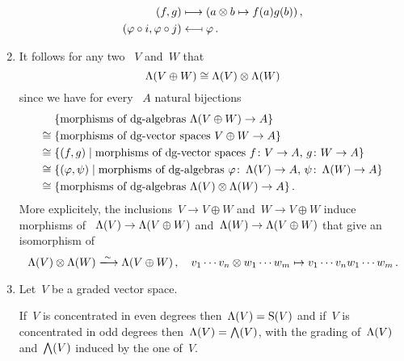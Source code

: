 \begin{enumerate}
\begin{align*}
      (f, g)
      &\longmapsto
      (a \otimes b \mapsto f(a) g(b)) \,,
      \\
      (\varphi \circ i, \varphi \circ j)
      &\longmapsfrom
      \varphi \,.
    \end{align*}
  \item
    It follows for any two {\dgvs}~$V$ and~$W$ that
    \[
      \operatorname{\Lambda}(V \oplus W)
      \cong
      \operatorname{\Lambda}(V) \otimes \operatorname{\Lambda}(W)
    \]
    since we have for every {\dga}~$A$ natural bijections
    \begin{align*}
      {}&
      \{ \text{morphisms of {\dgas}~$\dgSymm(V \oplus W) \to A$} \}
      \\
      \cong{}&
      \{ \text{morphisms of {\dgvs}~$V \oplus W \to A$} \}
      \\
      \cong{}&
      \{
        (f,g)
      \suchthat
        \text{morphisms of {\dgvs}~$f \colon V \to A$,~$g \colon W \to A$}
      \}
      \\
      \cong{}&
      \{
        (\varphi, \psi)
      \suchthat
        \text{morphisms of {\dgas}~$\varphi \colon \dgSymm(V) \to A$,~$\psi \colon \dgSymm(W) \to A$}
      \}
      \\
      \cong{}&
      \{ \text{morphisms of {\dgas}~$\dgSymm(V) \tensor \dgSymm(W) \to A$} \} \,.
    \end{align*}
    More explicitely, the inclusions~$V \to V \oplus W$ and~$W \to V \oplus W$ induce morphisms of {\dgas}~$\operatorname{\Lambda}(V) \to \operatorname{\Lambda}(V \oplus W)$ and~$\operatorname{\Lambda}(W) \to \operatorname{\Lambda}(V \oplus W)$ that give an isomorphism of {\dgas}
    \[
      \dgSymm(V) \tensor \dgSymm(W)
      \xlongto{\sim}
      \dgSymm(V \oplus W) \,,
      \quad
      v_1 \dotsm v_n \tensor w_1 \dotsm w_m
      \mapsto
      v_1 \dotsm v_n w_1 \dotsm w_m \,.
    \]
  \item
    Let~$V$ be a graded vector space.
    
    If~$V$ is concentrated in even degrees then~$\operatorname{\Lambda}(V) = \operatorname{S}(V)$ and if~$V$ is concentrated in odd degrees then~$\operatorname{\Lambda}(V) = \bigwedge(V)$, with the grading of~$\operatorname{\Lambda}(V)$ and~$\bigwedge(V)$ induced by the one of~$V$.
    

\end{enumerate}
